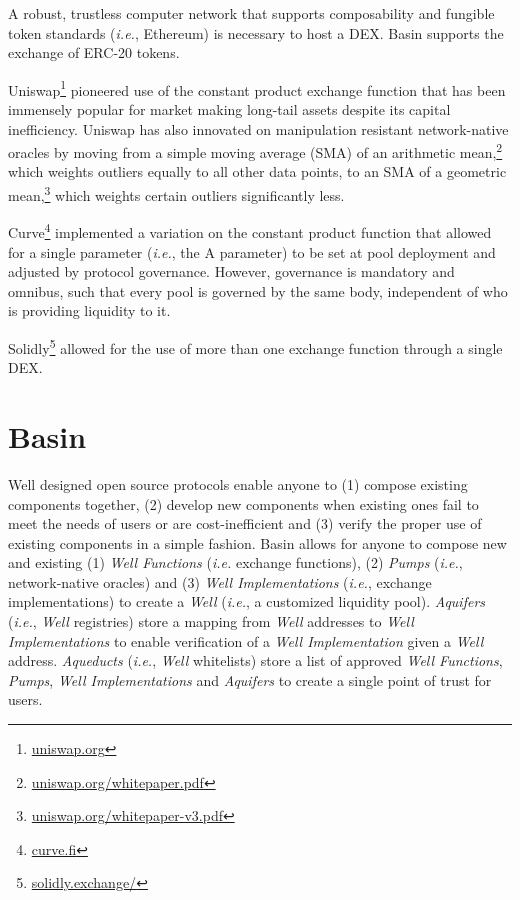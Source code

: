 \documentclass[tikz]{article}
\newcommand{\term}[1]{\textsl{#1}}
\newcommand{\fref}[1]{\footnote{\href{http://#1}{#1}}}
\begin{document}
A robust, trustless computer network that supports composability and fungible token standards (\textit{i.e.}, Ethereum) is necessary to host a DEX. Basin supports the exchange of ERC-20 tokens.

Uniswap\fref{uniswap.org} pioneered use of the constant product exchange function that has been immensely popular for market making long-tail assets despite its capital inefficiency. Uniswap has also innovated on manipulation resistant network-native oracles by moving from a simple moving average (SMA) of an arithmetic mean,\fref{uniswap.org/whitepaper.pdf} which weights outliers equally to all other data points, to an SMA of a geometric mean,\fref{uniswap.org/whitepaper-v3.pdf} which weights certain outliers significantly less.

Curve\fref{curve.fi} implemented a variation on the constant product function that allowed for a single parameter (\textit{i.e.}, the A parameter) to be set at pool deployment and adjusted by protocol governance. However, governance is mandatory and omnibus, such that every pool is governed by the same body, independent of who is providing liquidity to it.

Solidly\fref{solidly.exchange/} allowed for the use of more than one exchange function through a single DEX. 

\section{Basin}
Well designed open source protocols enable anyone to (1) compose existing components together, (2) develop new components when existing ones fail to meet the needs of users or are cost-inefficient and (3) verify the proper use of existing components in a simple fashion. Basin allows for anyone to compose new and existing (1) \term{Well Functions} (\textit{i.e.} exchange functions), (2) \term{Pumps} (\textit{i.e.}, network-native oracles) and (3) \term{Well Implementations} (\textit{i.e.}, exchange implementations) to create a \term{Well} (\textit{i.e.}, a customized liquidity pool). \term{Aquifers} (\textit{i.e.}, \term{Well} registries) store a mapping from \term{Well} addresses to \term{Well Implementations} to enable verification of a \term{Well Implementation} given a \term{Well} address. \term{Aqueducts} (\textit{i.e.}, \term{Well} whitelists) store a list of approved \term{Well Functions}, \term{Pumps}, \term{Well Implementations} and \term{Aquifers} to create a single point of trust for users.
\end{document}
